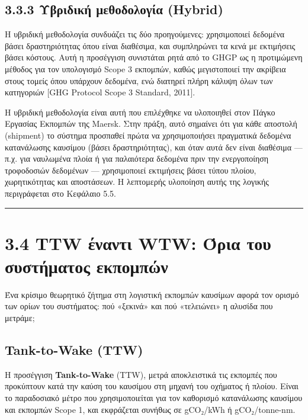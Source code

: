 \documentclass[11pt,a4paper,greek,twoside]{template-xe}
\begin{document}
\subsection{3.3.3 Υβριδική μεθοδολογία
(Hybrid)}\label{ux3c5ux3b2ux3c1ux3b9ux3b4ux3b9ux3baux3ae-ux3bcux3b5ux3b8ux3bfux3b4ux3bfux3bbux3bfux3b3ux3afux3b1-hybrid}

Η υβριδική μεθοδολογία συνδυάζει τις δύο προηγούμενες: χρησιμοποιεί
δεδομένα βάσει δραστηριότητας όπου είναι διαθέσιμα, και συμπληρώνει τα
κενά με εκτιμήσεις βάσει κόστους. Αυτή η προσέγγιση συνιστάται ρητά από
το GHGP ως η προτιμώμενη μέθοδος για τον υπολογισμό Scope 3 εκπομπών,
καθώς μεγιστοποιεί την ακρίβεια στους τομείς όπου υπάρχουν δεδομένα, ενώ
διατηρεί πλήρη κάλυψη όλων των κατηγοριών {[}GHG Protocol Scope 3
Standard, 2011{]}.

Η υβριδική μεθοδολογία είναι αυτή που επιλέχθηκε να υλοποιηθεί στον
Πάγκο Εργασίας Εκπομπών της Maersk. Στην πράξη, αυτό σημαίνει ότι για
κάθε αποστολή (shipment) το σύστημα προσπαθεί πρώτα να χρησιμοποιήσει
πραγματικά δεδομένα κατανάλωσης καυσίμου (βάσει δραστηριότητας), και
όταν αυτά δεν είναι διαθέσιμα --- π.χ. για ναυλωμένα πλοία ή για
παλαιότερα δεδομένα πριν την ενεργοποίηση τροφοδοσιών δεδομένων ---
χρησιμοποιεί εκτιμήσεις βάσει τύπου πλοίου, χωρητικότητας και
αποστάσεων. Η λεπτομερής υλοποίηση αυτής της λογικής περιγράφεται στο
Κεφάλαιο 5.5.

\begin{center}\rule{0.5\linewidth}{0.5pt}\end{center}

\section{3.4 TTW έναντι WTW: Όρια του συστήματος
εκπομπών}\label{ttw-ux3adux3bdux3b1ux3bdux3c4ux3b9-wtw-ux3ccux3c1ux3b9ux3b1-ux3c4ux3bfux3c5-ux3c3ux3c5ux3c3ux3c4ux3aeux3bcux3b1ux3c4ux3bfux3c2-ux3b5ux3baux3c0ux3bfux3bcux3c0ux3ceux3bd}

Ένα κρίσιμο θεωρητικό ζήτημα στη λογιστική εκπομπών καυσίμων αφορά τον
ορισμό των ορίων του συστήματος: πού «ξεκινά» και πού «τελειώνει» η
αλυσίδα που μετράμε;

\subsection{Tank-to-Wake (TTW)}\label{tank-to-wake-ttw}

Η προσέγγιση \textbf{Tank-to-Wake} (TTW), μετρά αποκλειστικά τις
εκπομπές που προκύπτουν κατά την καύση του καυσίμου στη μηχανή του
οχήματος ή πλοίου. Είναι το παραδοσιακό μέτρο που χρησιμοποιείται για
τον καθορισμό κατανάλωσης καυσίμου και εκπομπών Scope 1, και εκφράζεται
συνήθως σε gCO₂/kWh ή gCO₂/tonne-nm.
\end{document}
